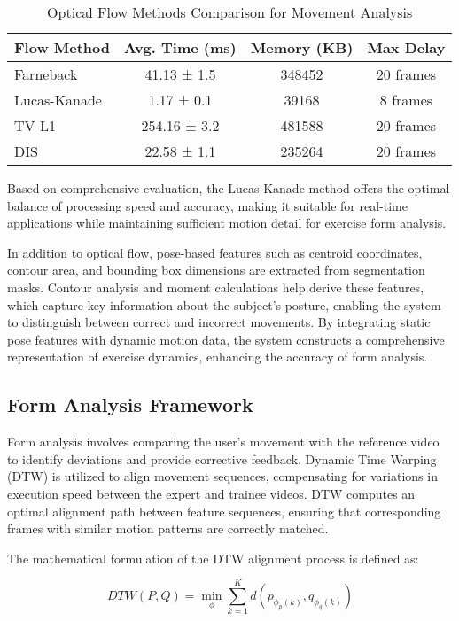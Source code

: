 \documentclass[conference]{IEEEtran}
\begin{document}
\begin{table}[h]
\caption{Optical Flow Methods Comparison for Movement Analysis}
\centering
\begin{tabular}{|l|c|c|c|}
\hline
\textbf{Flow Method} & \textbf{Avg. Time (ms)} & \textbf{Memory (KB)} & \textbf{Max Delay} \\
\hline
Farneback & 41.13 ± 1.5 & 348452 & 20 frames \\
\hline
Lucas-Kanade & 1.17 ± 0.1 & 39168 & 8 frames \\
\hline
TV-L1 & 254.16 ± 3.2 & 481588 & 20 frames \\
\hline
DIS & 22.58 ± 1.1 & 235264 & 20 frames \\
\hline
\end{tabular}
\end{table}

Based on comprehensive evaluation, the Lucas-Kanade method offers the optimal balance of processing speed and accuracy, making it suitable for real-time applications while maintaining sufficient motion detail for exercise form analysis.

In addition to optical flow, pose-based features such as centroid coordinates, contour area, and bounding box dimensions are extracted from segmentation masks. Contour analysis and moment calculations help derive these features, which capture key information about the subject's posture, enabling the system to distinguish between correct and incorrect movements. By integrating static pose features with dynamic motion data, the system constructs a comprehensive representation of exercise dynamics, enhancing the accuracy of form analysis.

\subsection{Form Analysis Framework} 
Form analysis involves comparing the user's movement with the reference video to identify deviations and provide corrective feedback. Dynamic Time Warping (DTW) is utilized to align movement sequences, compensating for variations in execution speed between the expert and trainee videos. DTW computes an optimal alignment path between feature sequences, ensuring that corresponding frames with similar motion patterns are correctly matched.

The mathematical formulation of the DTW alignment process is defined as:

\begin{equation}
DTW(P, Q) = \min_{\phi} \sum_{k=1}^{K} d(p_{\phi_p(k)}, q_{\phi_q(k)})
\end{equation}
\end{document}
